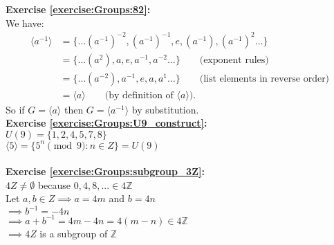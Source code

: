 \noindent\textbf{Exercise \ref{exercise:Groups:82}:}\\
We have:
\begin{align*}
\langle a^{-1}\rangle &= \{ \ldots (a^{-1})^{-2},(a^{-1})^{-1},e,(a^{-1}),(a^{-1})^2 \ldots\} \\
& = \{ \ldots (a^{2}),a,e,a^{-1},a^{-2} \ldots\} \qquad \text{(exponent rules)}\\
& = \{ \ldots (a^{-2}),a^{-1},e,a,a^1 \ldots\} \qquad \text{(list elements in reverse order)} \\
& = \langle a\rangle \qquad \text{(by definition of $\langle a\rangle$)}.
\end{align*}
So if $G=\langle a\rangle$ then $G=\langle a^{-1}\rangle$ by substitution.
\\

\noindent\textbf{Exercise \ref{exercise:Groups:U9_construct}:}\\
$U(9)=\{1,2,4,5,7,8\}$\\
$\langle 5\rangle=\{5^n\pmod{9}:n\in Z\}=U(9)$\\
\\

\noindent\textbf{Exercise \ref{exercise:Groups:subgroup_3Z}:}\\
$4Z\neq\emptyset$ because $0,4,8,...\in 4\mathbb{Z}$\\
Let $a,b\in Z\implies a=4m$ and $b=4n$\\
$\implies b^{-1}=-4n$\\
$\implies a+b^{-1}=4m-4n=4(m-n)\in 4\mathbb{Z}$\\
$\implies 4Z$ is a subgroup of $\mathbb{Z}$\\
\\

